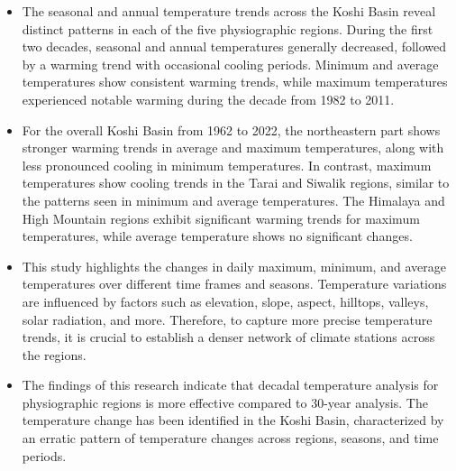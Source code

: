 

\begin{itemize}
  \item The seasonal and annual temperature trends across the Koshi Basin reveal distinct patterns in each of the five physiographic regions. During the first two decades, seasonal and annual temperatures generally decreased, followed by a warming trend with occasional cooling periods. Minimum and average temperatures show consistent warming trends, while maximum temperatures experienced notable warming during the decade from 1982 to 2011.
  
  \item For the overall Koshi Basin from 1962 to 2022, the northeastern part shows stronger warming trends in average and maximum temperatures, along with less pronounced cooling in minimum temperatures. In contrast, maximum temperatures show cooling trends in the Tarai and Siwalik regions, similar to the patterns seen in minimum and average temperatures. The Himalaya and High Mountain regions exhibit significant warming trends for maximum temperatures, while average temperature shows no significant changes.
  
  \item This study highlights the changes in daily maximum, minimum, and average temperatures over different time frames and seasons. Temperature variations are influenced by factors such as elevation, slope, aspect, hilltops, valleys, solar radiation, and more. Therefore, to capture more precise temperature trends, it is crucial to establish a denser network of climate stations across the regions.
  
  \item The findings of this research indicate that decadal temperature analysis for physiographic regions is more effective compared to 30-year analysis. The temperature change has been identified in the Koshi Basin, characterized by an erratic pattern of temperature changes across regions, seasons, and time periods.
\end{itemize}
